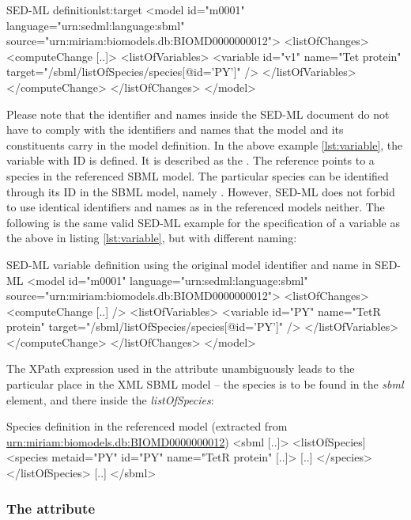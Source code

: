 %
\begin{myXmlLst}{SED-ML  definition}{lst:target}
<model id="m0001" language="urn:sedml:language:sbml" 
 source="urn:miriam:biomodels.db:BIOMD0000000012">
 <listOfChanges>
  <computeChange [..]>
   <listOfVariables>
    <variable id="v1" name="Tet protein" target="/sbml/listOfSpecies/species[@id='PY']" />
   </listOfVariables>
  </computeChange>
 </listOfChanges>
</model>
\end{myXmlLst}
%
Please note that the identifier and names inside the SED-ML document do not have to comply with the identifiers and names that the model and its constituents carry in the model definition. In the above example \ref{lst:variable}, the variable with ID  is defined. It is described as the . The reference points to a species in the referenced SBML model. The particular species can be identified through its ID in the SBML model, namely . However, SED-ML does not forbid to use identical identifiers and names as in the referenced models neither. The following is the same valid SED-ML example for the specification of a variable as the above in listing \ref{lst:variable}, but with different naming:
%
\begin{myXmlLst}{SED-ML variable definition using the original model identifier and name in SED-ML}{}
<model id="m0001" language="urn:sedml:language:sbml" 
 source="urn:miriam:biomodels.db:BIOMD0000000012">
 <listOfChanges>
  <computeChange [..] />
   <listOfVariables>
    <variable id="PY" name="TetR protein" target="/sbml/listOfSpecies/species[@id='PY']" />
   </listOfVariables>
  </computeChange>
 </listOfChanges>
</model>
\end{myXmlLst}
%

The XPath expression used in the  attribute unambiguously leads to the particular place in the XML SBML model -- the species is to be found in the \emph{sbml} element, and there inside the \emph{listOfSpecies}:
%
\begin{myXmlLst}{Species definition in the referenced model (extracted from \url{urn:miriam:biomodels.db:BIOMD0000000012})}{}
<sbml [..]>
 <listOfSpecies]
  <species metaid="PY" id="PY" name="TetR protein" [..]>
   [..]
  </species>
 </listOfSpecies>
 [..]
</sbml>
\end{myXmlLst}
%

\subsubsection{The  attribute}
\label{sec:symbol}

